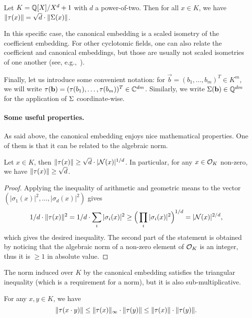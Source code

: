 \begin{proposition}
Let $K = \mathbb{Q}[X]/X^d+1$ with $d$ a power-of-two. Then for all $x \in K$, we have $\|\tau(x)\| = \sqrt{d} \cdot \|\Sigma(x)\|$.
\end{proposition}
In this specific case, the canonical embedding is a scaled isometry of the coefficient embedding. For other cyclotomic fields, one can also relate the coefficient and canonical embeddings, but those are usually not scaled isometries of one another (see, e.g.,~\cite{Blanco}).

Finally, let us introduce some convenient notation: for $\vec b = (b_1, \dots, b_m)^T \in K^m$, we will write $\tau(\mathbf b) = (\tau(b_1), \dots, \tau(b_m))^T \in \mathbb{C}^{dm}$. Similarly, we write $\Sigma(\mathbf b) \in \mathbb{Q}^{dm}$ for the application of $\Sigma$ coordinate-wise.

\paragraph{Some useful properties.} As said above, the canonical embedding enjoys nice mathematical properties. One of them is that it can be related to the algebraic norm.

\begin{lemma}
\label{lemma:AM-GM-inequality}
Let $x \in K$, then $\|\tau(x)\| \geq \sqrt{d} \cdot |\mathcal{N}(x)|^{1/d}$. In particular, for any $x \in \mathcal{O}_K$ non-zero, we have $\|\tau(x)\| \geq \sqrt{d}$.
\end{lemma}

\begin{proof}
Applying the inequality of arithmetic and geometric means to the vector $(|\sigma_1(x)|^2, \dots, |\sigma_d(x)|^2)$ gives
\[ 1/d \cdot \|\tau(x)\|^2 = 1/d \cdot \sum_i |\sigma_i(x)|^2 \geq \Big(\prod_i |\sigma_i(x)|^2\Big)^{1/d} = |\mathcal{N}(x)|^{2/d},\]
which gives the desired inequality. The second part of the statement is obtained by noticing that the algebraic norm of a non-zero element of $\mathcal{O}_K$ is an integer, thus it is $\geq 1$ in absolute value.
\end{proof}

The norm induced over $K$ by the canonical embedding satisfies the triangular inequality (which is a requirement for a norm), but it is also sub-multiplicative.

\begin{lemma}
For any $x,y \in K$, we have
\[\|\tau(x \cdot y)\| \leq \|\tau(x)\|_\infty \cdot \|\tau(y)\| \leq \|\tau(x)\| \cdot \|\tau(y)\|.\]
\end{lemma}

